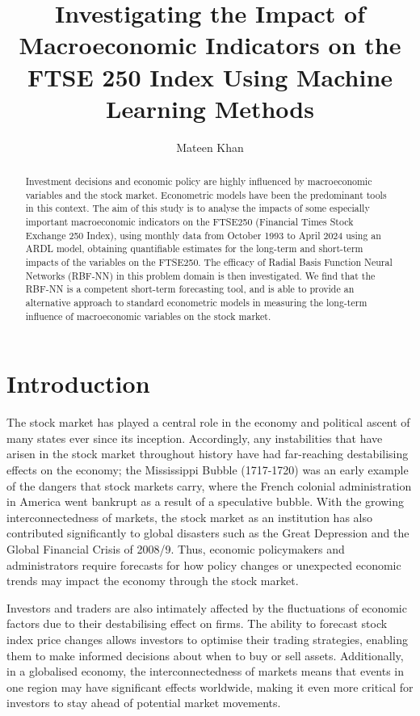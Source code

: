 \documentclass[11pt,a4paper]{article}
\title{Investigating the Impact of Macroeconomic Indicators 
on the FTSE 250 Index Using Machine Learning Methods}
\author{Mateen Khan}
\date{}
\begin{document}
\maketitle

\begin{abstract}
    Investment decisions and economic policy are highly influenced by 
    macroeconomic variables and the stock market. Econometric models
    have been the predominant tools in this context. The aim of this study is to analyse the impacts of some especially important macroeconomic
    indicators on the FTSE250 
    (Financial Times Stock Exchange 250 Index), using monthly data 
    from  October 1993 to April 2024 using an ARDL model, obtaining 
    quantifiable estimates for the long-term and short-term impacts of the variables
    on the FTSE250. The efficacy of Radial Basis Function 
    Neural Networks (RBF-NN) in this problem domain is then investigated. We find that 
    the RBF-NN is a competent short-term forecasting tool, and is able to 
    provide an alternative approach to standard econometric models in measuring the long-term influence of
    macroeconomic variables on the stock market.
\end{abstract}

\section{Introduction}

The stock market has played a central role in the economy and 
political ascent of many states ever since its inception. 
Accordingly, any instabilities that have arisen in the stock market 
throughout history have had far-reaching destabilising effects on the 
economy; the Mississippi Bubble (1717-1720) was an early example of the 
dangers that stock markets carry, where the French colonial administration 
in America went bankrupt as a result of a speculative bubble. With the
growing interconnectedness of markets, the stock market as an institution 
has also contributed significantly to global disasters such as the Great 
Depression and the Global Financial Crisis of 2008/9. Thus, economic 
policymakers and administrators require forecasts for how policy changes or 
unexpected economic trends may impact the economy through the stock market. 

Investors and traders are also intimately affected by the 
fluctuations of economic factors due to their destabilising effect on firms.
The ability to forecast stock index price changes allows 
investors to optimise their trading strategies, enabling them to make
informed decisions about when to buy or sell assets. 
Additionally, in a globalised economy, the interconnectedness of 
markets means that events in one region may have significant effects worldwide, 
making it even more critical for investors to stay ahead of potential market movements.
\end{document}
